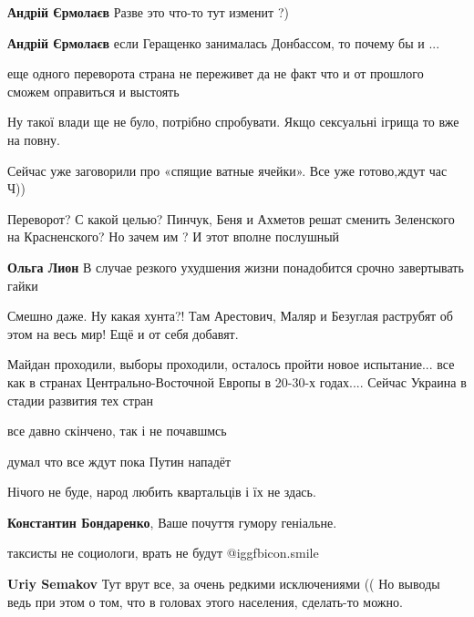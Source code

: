 \begin{itemize}
\begin{itemize}
\textbf{Андрій Єрмолаєв} Разве это что-то тут изменит ?)

\textbf{Андрій Єрмолаєв} если Геращенко занималась Донбассом, то почему бы и ...
\end{itemize} %

еще одного переворота страна не переживет да не факт что и от прошлого сможем оправиться и выстоять

Ну такої влади ще не було, потрібно спробувати. Якщо сексуальні ігрища то вже на повну.

Сейчас уже заговорили про «спящие ватные ячейки». Все уже готово,ждут час Ч))

Переворот? С какой целью? Пинчук, Беня и Ахметов решат сменить Зеленского на Красненского? Но зачем им ? И этот вполне послушный

\begin{itemize} %
\textbf{Ольга Лион} В случае резкого ухудшения жизни понадобится срочно завертывать гайки
\end{itemize} %

Смешно даже. Ну какая хунта?! Там Арестович, Маляр и Безуглая раструбят об этом на весь мир! Ещё и от себя добавят.


Майдан проходили, выборы проходили, осталось пройти новое испытание... все как в
странах Центрально-Восточной Европы в 20-30-х годах.... Сейчас Украина в стадии
развития тех стран

все давно скінчено, так і не почавшмсь

думал что все ждут пока Путин нападёт

Нічого не буде, народ любить квартальців і їх не здась.

\textbf{Константин Бондаренко}, Ваше почуття гумору геніальне.

таксисты не социологи, врать не будут  @igg{fbicon.smile} 

\begin{itemize} %
\textbf{Uriy Semakov} Тут врут все, за очень редкими исключениями (( Но выводы ведь при этом о том, что в головах этого населения, сделать-то можно.
\end{itemize} %


\end{itemize}
